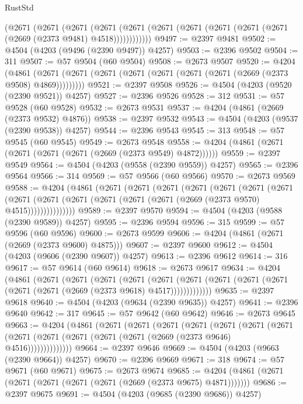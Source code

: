 \begin{lexlean}{RustStd}
\begin{coremodule}
      (@2671
        (@2671
          (@2671
            (@2671 (@2671 (@2671 (@2671 (@2671 (@2671 (@2671 (@2669 (@2373 @9481) @4518))))))))))))
@9497 := @2397 @9481
@9502 := @4504 (@4203 (@9496 (@2390 @9497)) @4257)
@9503 := @2396 @9502
@9504 := 311
@9507 := @57 @9504 (@60 @9504)
@9508 := @2673 @9507
@9520 := @4204
    (@4861 (@2671 (@2671 (@2671 (@2671 (@2671 (@2671 (@2671 (@2669 (@2373 @9508) @4869)))))))))
@9521 := @2397 @9508
@9526 := @4504 (@4203 (@9520 (@2390 @9521)) @4257)
@9527 := @2396 @9526
@9528 := 312
@9531 := @57 @9528 (@60 @9528)
@9532 := @2673 @9531
@9537 := @4204 (@4861 (@2669 (@2373 @9532) @4876))
@9538 := @2397 @9532
@9543 := @4504 (@4203 (@9537 (@2390 @9538)) @4257)
@9544 := @2396 @9543
@9545 := 313
@9548 := @57 @9545 (@60 @9545)
@9549 := @2673 @9548
@9558 := @4204 (@4861 (@2671 (@2671 (@2671 (@2671 (@2669 (@2373 @9549) @4872))))))
@9559 := @2397 @9549
@9564 := @4504 (@4203 (@9558 (@2390 @9559)) @4257)
@9565 := @2396 @9564
@9566 := 314
@9569 := @57 @9566 (@60 @9566)
@9570 := @2673 @9569
@9588 := @4204
    (@4861
      (@2671
        (@2671
          (@2671
            (@2671
              (@2671
                (@2671
                  (@2671
                    (@2671
                      (@2671 (@2671 (@2671 (@2671 (@2671 (@2669 (@2373 @9570) @4515)))))))))))))))
@9589 := @2397 @9570
@9594 := @4504 (@4203 (@9588 (@2390 @9589)) @4257)
@9595 := @2396 @9594
@9596 := 315
@9599 := @57 @9596 (@60 @9596)
@9600 := @2673 @9599
@9606 := @4204 (@4861 (@2671 (@2669 (@2373 @9600) @4875)))
@9607 := @2397 @9600
@9612 := @4504 (@4203 (@9606 (@2390 @9607)) @4257)
@9613 := @2396 @9612
@9614 := 316
@9617 := @57 @9614 (@60 @9614)
@9618 := @2673 @9617
@9634 := @4204
    (@4861
      (@2671
        (@2671
          (@2671
            (@2671
              (@2671
                (@2671 (@2671 (@2671 (@2671 (@2671 (@2671 (@2669 (@2373 @9618) @4517)))))))))))))
@9635 := @2397 @9618
@9640 := @4504 (@4203 (@9634 (@2390 @9635)) @4257)
@9641 := @2396 @9640
@9642 := 317
@9645 := @57 @9642 (@60 @9642)
@9646 := @2673 @9645
@9663 := @4204
    (@4861
      (@2671
        (@2671
          (@2671
            (@2671
              (@2671
                (@2671
                  (@2671 (@2671 (@2671 (@2671 (@2671 (@2671 (@2669 (@2373 @9646) @4516))))))))))))))
@9664 := @2397 @9646
@9669 := @4504 (@4203 (@9663 (@2390 @9664)) @4257)
@9670 := @2396 @9669
@9671 := 318
@9674 := @57 @9671 (@60 @9671)
@9675 := @2673 @9674
@9685 := @4204 (@4861 (@2671 (@2671 (@2671 (@2671 (@2671 (@2669 (@2373 @9675) @4871)))))))
@9686 := @2397 @9675
@9691 := @4504 (@4203 (@9685 (@2390 @9686)) @4257)

\end{coremodule}
\end{lexlean}
